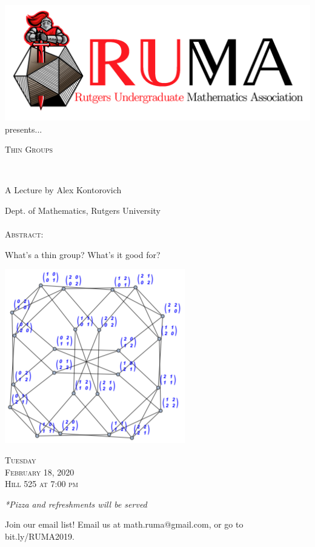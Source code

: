 \documentclass[12pt]{article}
\begin{document}

\begin{center}\includegraphics[scale=.40]{RUMAlogo.png}\\
  presents...

  \vspace{2mm}
\begin{spacing}{1}
{\fontsize{40}{44}\selectfont  \textsc{
Thin Groups}} \end{spacing}
 

~~\\
\begin{spacing}{1.5}
{\fontsize{24}{24} \selectfont A Lecture by Alex
  Kontorovich}  \end{spacing}
\large Dept. of Mathematics, Rutgers University \\~~\\

\normalsize
\textsc{Abstract:}

\LARGE
What's a thin group? What's it good for?

\vspace{5mm} 
\begin{center}
  \includegraphics[scale=1]{ThinGroup.png}
\end{center}
\vspace{5mm} 
\Huge   \textsc{Tuesday\\February 18, 2020 \\Hill 525 at 7:00
  pm}

\vspace{2mm}
\large
\emph{*Pizza and refreshments will be served}
\end{center}

\begin{center}
  \large  Join our email list! Email us at math.ruma@gmail.com, or
go to bit.ly/RUMA2019.\\
\end{center}
\end{document}
